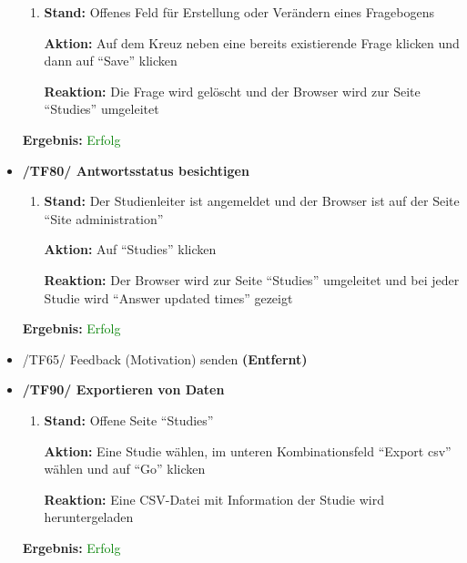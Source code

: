 \documentclass[a4paper]{scrreprt}
\begin{document}
\begin{itemize}
\begin{enumerate}
                        \item \par \textbf{Stand: }Offenes Feld f\"ur Erstellung oder Ver\"andern eines Fragebogens
                              \par \textbf{Aktion: }Auf dem Kreuz neben eine bereits existierende Frage klicken und dann auf ``Save'' klicken
                              \par \textbf{Reaktion: }Die Frage wird gel\"oscht und der Browser wird zur Seite ``Studies'' umgeleitet
                    \end{enumerate}
					\vspace*{0.3cm}
		           \par \textbf{Ergebnis: }\textcolor{green}{Erfolg}
		           \vspace*{0.6cm}


                \item \textbf{/TF80/ Antwortsstatus besichtigen}
                    \begin{enumerate}
                        \item \par \textbf{Stand: } Der Studienleiter ist angemeldet und der Browser ist auf der Seite ``Site administration''
                              \par \textbf{Aktion: }Auf ``Studies'' klicken
                              \par \textbf{Reaktion: }Der Browser wird zur Seite ``Studies'' umgeleitet und bei jeder Studie wird ``Answer updated times'' gezeigt
                    \end{enumerate}		
					\vspace*{0.3cm}
		           \par \textbf{Ergebnis: }\textcolor{green}{Erfolg}
		           \vspace*{0.6cm} 	
		
				\item /TF65/ Feedback (Motivation) senden \textbf{(Entfernt)}	
				\vspace*{0.6cm}	
				
                \item \textbf{/TF90/ Exportieren von Daten}
                \begin{enumerate}
                    \item \par \textbf{Stand: }Offene Seite ``Studies''
                          \par \textbf{Aktion: }Eine Studie w\"ahlen, im unteren Kombinationsfeld ``Export csv'' w\"ahlen und auf ``Go'' klicken
                          \par \textbf{Reaktion: }Eine CSV-Datei mit Information der Studie wird heruntergeladen
                \end{enumerate}	
					\vspace*{0.3cm}
		           \par \textbf{Ergebnis: }\textcolor{green}{Erfolg}
		           \vspace*{0.6cm}                 			
		
		           \end{itemize}
	
\end{document}
